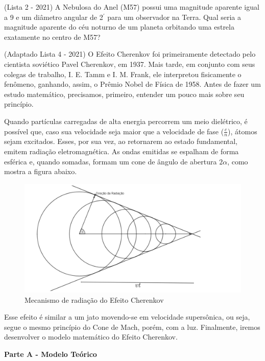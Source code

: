 \documentclass[11pt]{article}
\begin{document}
\begin{pproblem}(Lista 2 - 2021)
    A Nebulosa do Anel (M57) possui uma magnitude aparente igual a 9 e um
diâmetro angular de 2$^{\prime}$ para um observador na Terra. Qual seria a magnitude aparente do céu
noturno de um planeta orbitando uma estrela exatamente no centro de M57?

\end{pproblem}


\begin{pproblem} (Adaptado Lista 4 - 2021)
    O Efeito Cherenkov foi primeiramente detectado pelo cientista soviético
    Pavel Cherenkov, em 1937. Mais tarde, em conjunto com seus colegas de trabalho, I. E. Tamm e
    I. M. Frank, ele interpretou fisicamente o fenômeno, ganhando, assim, o Prêmio Nobel de Física
    de 1958. Antes de fazer um estudo matemático, precisamos, primeiro, entender um pouco mais
    sobre seu princípio.

    Quando partículas carregadas de alta energia percorrem um meio dielétrico, é possível que, caso
    sua velocidade seja maior que a velocidade de fase ($\frac{c}{n}$), átomos sejam excitados. Esses, por sua
    vez, ao retornarem ao estado fundamental, emitem radiação eletromagnética. As ondas emitidas
    se espalham de forma esférica e, quando somadas, formam um cone de ângulo de abertura $2\alpha$,
    como mostra a figura abaixo.
    \begin{figure}[H]
      \centering
      \includegraphics[width=0.9\linewidth]{imagens/cherenkov.png}  
      \caption{Mecanismo de radiação do Efeito Cherenkov}
    \end{figure}

    Esse efeito é similar a um jato movendo-se em velocidade supersônica, ou seja, segue o mesmo
    princípio do Cone de Mach, porém, com a luz. Finalmente, iremos desenvolver o modelo matemático do Efeito Cherenkov.

    \begin{center}
        \textbf{Parte A - Modelo Teórico}    
    \end{center}
    

\end{pproblem}
\end{document}
